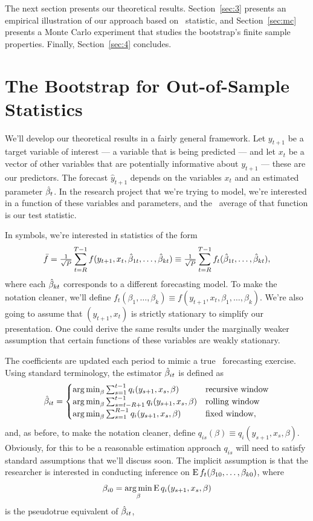 \documentclass[12pt,fleqn]{article}
\begin{document}
The next section presents our theoretical results. Section~\ref{sec:3}
presents an empirical illustration of our approach based on
 \oos\ statistic, and Section~\ref{sec:mc} presents a
Monte Carlo experiment that studies the bootstrap's finite sample
properties. Finally, Section~\ref{sec:4} concludes.

\section{The Bootstrap for Out-of-Sample Statistics}

We'll develop our theoretical results in a fairly general
framework. Let $y_{t+1}$ be a target variable of interest --- a
variable that is being predicted --- and let $x_t$ be a vector of
other variables that are potentially informative about $y_{t+1}$ ---
these are our predictors. The forecast $\hat y_{t+1}$ depends on the
variables $x_t$ and an estimated parameter $\hat \beta_t$. In the research
project that we're trying to model, we're interested in a function of
these variables and parameters, and the \oos\ average of that function
is our test statistic.

In symbols, we're interested in statistics of the form
\begin{equation*}
  \bar f = \tfrac{1}{\sqrt{P}} \sum_{t=R}^{T-1} f(y_{t+1}, x_t, \hat \beta_{1t},\dots,\hat \beta_{kt})
  \equiv \tfrac{1}{\sqrt{P}} \sum_{t=R}^{T-1} f_t(\hat \beta_{1t},\dots,\hat \beta_{kt}),
\end{equation*}
where each $\hat \beta_{kt}$ corresponds to a different forecasting model.
To make the notation cleaner, we'll define $f_t(\beta_1,\dots,\beta_k)
\equiv f(y_{t+1}, x_t, \beta_1,\dots,\beta_k)$. We're also going to
assume that $(y_{t+1}, x_t)$ is strictly stationary to simplify our
presentation. One could derive the same results under the marginally
weaker assumption that certain functions of these variables are weakly
stationary.

The coefficients are updated each period to mimic a true \oos\
forecasting exercise.
Using standard terminology, the estimator $\hat \beta_{it}$ is defined as
\begin{equation}\label{eq:9}
  \hat\beta_{it} = \begin{cases}
    \operatorname*{arg\,min}_\beta \sum_{s=1}^{t-1} q_i(y_{s+1}, x_s, \beta) & \text{recursive window} \\
    \operatorname*{arg\,min}_\beta \sum_{s=t-R+1}^{t-1} q_i(y_{s+1}, x_s, \beta) & \text{rolling window} \\
    \operatorname*{arg\,min}_\beta \sum_{s=1}^{R-1} q_i(y_{s+1}, x_s, \beta) & \text{fixed window},
  \end{cases}
\end{equation}
and, as before, to make the notation cleaner, define $q_{is}(\beta)
\equiv q_i(y_{s+1},x_s,\beta)$. Obviously, for this to be a reasonable
estimation approach $q_{is}$ will need to satisfy standard assumptions
that we'll discuss soon. The implicit assumption is that the
researcher is interested in conducting inference on $\operatorname{E}
f_t(\beta_{10},\dots,\beta_{k0})$, where
\begin{equation*}
  \beta_{i0} = \operatorname*{arg\,min}_\beta \operatorname{E} q_i(y_{s+1}, x_s, \beta)
\end{equation*}
is the pseudotrue equivalent of $\hat \beta_{it}$,
\end{document}
